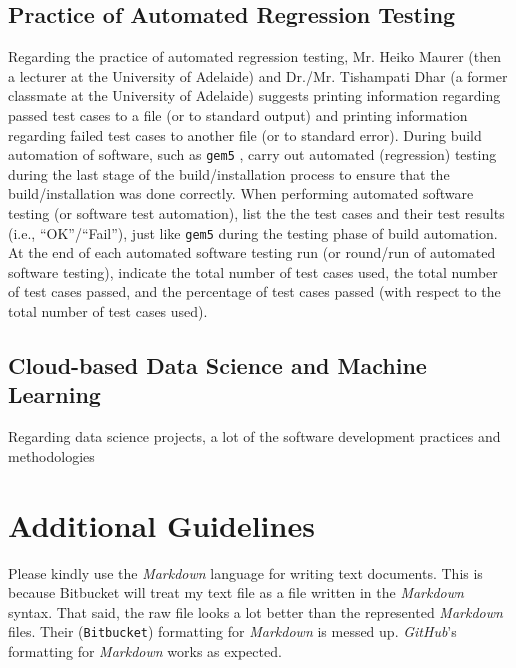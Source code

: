 \documentclass[letter,12pt]{article}
\begin{document}
\subsection{Practice of Automated Regression Testing}
\label{ssec:PracticeOfAutomatedRegressionTesting}

Regarding the practice of automated regression testing, Mr. Heiko Maurer (then a lecturer at the University of Adelaide) and Dr./Mr. Tishampati Dhar (a former classmate at the University of Adelaide) suggests printing information regarding passed test cases to a file (or to standard output) and printing information regarding failed test cases to another file (or to standard error). During build automation of software, such as {\tt gem5} \cite{gem5developers2014,Binkert2011}, carry out automated (regression) testing during the last stage of the build/installation process to ensure that the build/installation was done correctly. When performing automated software testing (or software test automation), list the the test cases and their test results (i.e., ``OK''/``Fail''), just like {\tt gem5} during the testing phase of build automation. At the end of each automated software testing run (or round/run of automated software testing), indicate the total number of test cases used, the total number of test cases passed, and the percentage of test cases passed (with respect to the total number of test cases used).



\subsection{Cloud-based Data Science and Machine Learning}
\label{ssec:CloudBasedDataScienceAndMachineLearning}

Regarding data science projects, a lot of the software development practices and methodologies 
\cite{Cady2017}








\section{Additional Guidelines}
\label{sec:AdditionalGuidelines}

Please kindly use the {\it Markdown} language for writing text documents. This is because Bitbucket will treat my text file as a file written in the {\it Markdown} syntax. That said, the raw file looks a lot better than the represented {\it Markdown} files. Their ({\tt Bitbucket}) formatting for {\it Markdown} is messed up. {\it GitHub}'s formatting for {\it Markdown} works as expected. \\
\end{document}
